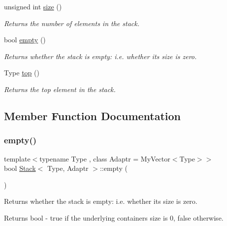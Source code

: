 \begin{DoxyCompactItemize}
unsigned int \hyperlink{classStack_adef875b60438b6210672cec86c0ba1e8}{size} ()
\begin{DoxyCompactList}\small\item\em Returns the number of elements in the stack. \end{DoxyCompactList}\item 
bool \hyperlink{classStack_a756ca38398e41f6eb7e924c895ed9338}{empty} ()
\begin{DoxyCompactList}\small\item\em Returns whether the stack is empty\+: i.\+e. whether its size is zero. \end{DoxyCompactList}\item 
Type \hyperlink{classStack_a4ec6a7947857564e39ed4bd62392fb3a}{top} ()
\begin{DoxyCompactList}\small\item\em Returns the top element in the stack. \end{DoxyCompactList}\end{DoxyCompactItemize}


\subsection{Member Function Documentation}
\mbox{\label{classStack_a756ca38398e41f6eb7e924c895ed9338}} 
\subsubsection{\texorpdfstring{empty()}{empty()}}
{\footnotesize\ttfamily template$<$typename Type , class Adaptr  = My\+Vector$<$\+Type$>$$>$ \\
bool \hyperlink{classStack}{Stack}$<$ Type, Adaptr $>$\+::empty (\begin{DoxyParamCaption}{ }\end{DoxyParamCaption})}



Returns whether the stack is empty\+: i.\+e. whether its size is zero. 

\begin{DoxyReturn}{Returns}
bool -\/ true if the underlying container\textquotesingle{}s size is 0, false otherwise. 
\end{DoxyReturn}
\mbox{\label{classStack_adef875b60438b6210672cec86c0ba1e8}} 
